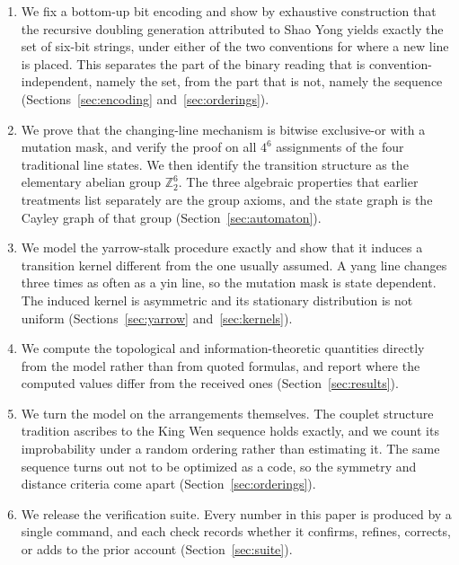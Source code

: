 \documentclass[11pt,a4paper]{article}
\newcommand{\Ztwo}{\mathbb{Z}_2}
\begin{document}
\begin{enumerate}
\item We fix a bottom-up bit encoding and show by exhaustive construction that
the recursive doubling generation attributed to Shao Yong yields exactly the set
of six-bit strings, under either of the two conventions for where a new line is
placed. This separates the part of the binary reading that is
convention-independent, namely the set, from the part that is not, namely the
sequence (Sections~\ref{sec:encoding} and~\ref{sec:orderings}).

\item We prove that the changing-line mechanism is bitwise exclusive-or with a
mutation mask, and verify the proof on all $4^6$ assignments of the four
traditional line states. We then identify the transition structure as the
elementary abelian group $\Ztwo^6$. The three algebraic properties that earlier
treatments list separately are the group axioms, and the state graph is the
Cayley graph of that group (Section~\ref{sec:automaton}).

\item We model the yarrow-stalk procedure exactly and show that it induces a
transition kernel different from the one usually assumed. A yang line changes
three times as often as a yin line, so the mutation mask is state dependent. The
induced kernel is asymmetric and its stationary distribution is not uniform
(Sections~\ref{sec:yarrow} and~\ref{sec:kernels}).

\item We compute the topological and information-theoretic quantities directly
from the model rather than from quoted formulas, and report where the computed
values differ from the received ones (Section~\ref{sec:results}).

\item We turn the model on the arrangements themselves. The couplet structure
tradition ascribes to the King Wen sequence holds exactly, and we count its
improbability under a random ordering rather than estimating it. The same
sequence turns out not to be optimized as a code, so the symmetry and distance
criteria come apart (Section~\ref{sec:orderings}).

\item We release the verification suite. Every number in this paper is produced
by a single command, and each check records whether it confirms, refines,
corrects, or adds to the prior account (Section~\ref{sec:suite}).
\end{enumerate}
\end{document}

